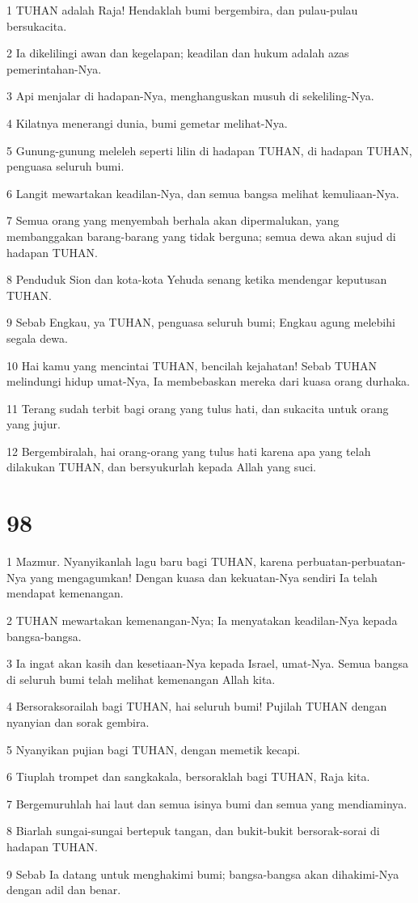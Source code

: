 \par 1 TUHAN adalah Raja! Hendaklah bumi bergembira, dan pulau-pulau bersukacita.
\par 2 Ia dikelilingi awan dan kegelapan; keadilan dan hukum adalah azas pemerintahan-Nya.
\par 3 Api menjalar di hadapan-Nya, menghanguskan musuh di sekeliling-Nya.
\par 4 Kilatnya menerangi dunia, bumi gemetar melihat-Nya.
\par 5 Gunung-gunung meleleh seperti lilin di hadapan TUHAN, di hadapan TUHAN, penguasa seluruh bumi.
\par 6 Langit mewartakan keadilan-Nya, dan semua bangsa melihat kemuliaan-Nya.
\par 7 Semua orang yang menyembah berhala akan dipermalukan, yang membanggakan barang-barang yang tidak berguna; semua dewa akan sujud di hadapan TUHAN.
\par 8 Penduduk Sion dan kota-kota Yehuda senang ketika mendengar keputusan TUHAN.
\par 9 Sebab Engkau, ya TUHAN, penguasa seluruh bumi; Engkau agung melebihi segala dewa.
\par 10 Hai kamu yang mencintai TUHAN, bencilah kejahatan! Sebab TUHAN melindungi hidup umat-Nya, Ia membebaskan mereka dari kuasa orang durhaka.
\par 11 Terang sudah terbit bagi orang yang tulus hati, dan sukacita untuk orang yang jujur.
\par 12 Bergembiralah, hai orang-orang yang tulus hati karena apa yang telah dilakukan TUHAN, dan bersyukurlah kepada Allah yang suci.

\chapter{98}

\par 1 Mazmur. Nyanyikanlah lagu baru bagi TUHAN, karena perbuatan-perbuatan-Nya yang mengagumkan! Dengan kuasa dan kekuatan-Nya sendiri Ia telah mendapat kemenangan.
\par 2 TUHAN mewartakan kemenangan-Nya; Ia menyatakan keadilan-Nya kepada bangsa-bangsa.
\par 3 Ia ingat akan kasih dan kesetiaan-Nya kepada Israel, umat-Nya. Semua bangsa di seluruh bumi telah melihat kemenangan Allah kita.
\par 4 Bersoraksorailah bagi TUHAN, hai seluruh bumi! Pujilah TUHAN dengan nyanyian dan sorak gembira.
\par 5 Nyanyikan pujian bagi TUHAN, dengan memetik kecapi.
\par 6 Tiuplah trompet dan sangkakala, bersoraklah bagi TUHAN, Raja kita.
\par 7 Bergemuruhlah hai laut dan semua isinya bumi dan semua yang mendiaminya.
\par 8 Biarlah sungai-sungai bertepuk tangan, dan bukit-bukit bersorak-sorai di hadapan TUHAN.
\par 9 Sebab Ia datang untuk menghakimi bumi; bangsa-bangsa akan dihakimi-Nya dengan adil dan benar.

